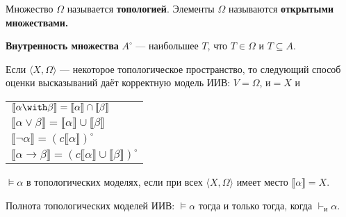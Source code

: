 Множество $\Omega$ называется \textbf{топологией}.
Элементы $\Omega$ называются \textbf{открытыми множествами.}

 \textbf{Внутренность множества} $A^\circ$ --- наибольшее $T$, что $T \in \Omega$ и $T \subseteq A$. 


 Если $\langle X, \Omega\rangle$ --- некоторое топологическое пространство, то следующий способ оценки высказываний
даёт корректную модель ИИВ: $V = \Omega$, $\text{и} = X$ и 
\begin{tabular}{l}
$\llbracket \alpha \with \beta \rrbracket = \llbracket \alpha \rrbracket \cap \llbracket \beta \rrbracket$\\
$\llbracket \alpha \vee \beta \rrbracket = \llbracket \alpha \rrbracket \cup \llbracket \beta \rrbracket$\\
$\llbracket \neg\alpha \rrbracket = (c\llbracket \alpha \rrbracket)^\circ$\\
$\llbracket \alpha \rightarrow \beta \rrbracket = (c\llbracket \alpha \rrbracket \cup \llbracket \beta \rrbracket)^\circ$
\end{tabular}

$\models\alpha$ в топологических моделях, если при всех $\langle X,\Omega\rangle$ имеет место $\llbracket \alpha \rrbracket = X$.

Полнота топологических моделей ИИВ: $\models\alpha$ тогда и только тогда, когда $\vdash_\text{и}\alpha$.


